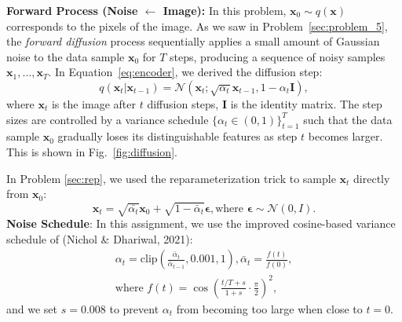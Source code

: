 \documentclass[11pt,addpoints,answers]{exam}
\newcommand{\xv}{\mathbf{x}}
\newcommand{\epsilonv   }{\boldsymbol \epsilon   }
\begin{document}
\begin{questions}
    \textbf{Forward Process (Noise $\leftarrow$ Image):} 
    In this problem, $\xv_0 \sim q(\xv)$ corresponds to the pixels of the image. As we saw in Problem~\ref{sec:problem_5}, the \textit{forward diffusion} process  sequentially applies a small amount of Gaussian noise to the data sample $\xv_0$ for \( T \) steps, producing a sequence of noisy samples \( \xv_1, \ldots, \xv_T \).
    In Equation~\ref{eq:encoder}, we derived the diffusion step:
    \begin{equation}
        q(\xv_t | \xv_{t-1}) = \mathcal{N}(\xv_t; \sqrt{\alpha_t}\xv_{t-1}, 1-\alpha_t \boldsymbol{I}),
    \end{equation}
    where $\xv_t$ is the image after $t$ diffusion steps, $\boldsymbol{I}$ is the identity matrix.
    The step sizes are controlled by a variance schedule \( \{\alpha_t \in (0,1)\}_{t=1}^T \) such that the data sample \( \xv_0 \) gradually loses its distinguishable features as step \( t \) becomes larger. This is shown in Fig.~\ref{fig:diffusion}.
    \par

    In Problem \ref{sec:rep}, we used the reparameterization trick to sample \( \xv_t \) directly from \(\xv_0 \):
    \begin{equation}
        \xv_t = \sqrt{\bar{\alpha_t}}\xv_0 + \sqrt{1 - \bar\alpha_t} \epsilonv, \text{where } \epsilonv \sim \mathcal{N}(0,I).
        \label{eq:xt}
    \end{equation}
    \textbf{Noise Schedule}: In this assignment, we use the improved cosine-based variance schedule of (Nichol \& Dhariwal, 2021):
    \begin{equation}
        \begin{aligned}
            \alpha_t = \text{clip}\left(\frac{\bar{\alpha}_t}{\bar\alpha_{t-1}}, 0.001, 1\right), \bar{\alpha}_t = \frac{f(t)}{f(0)}, \\
            \text{where } f(t) = \cos\left(\frac{t/T + s}{1 + s} \cdot \frac{\pi}{2}\right)^2,
        \end{aligned}
    \end{equation}
    and we set $s=0.008$ to prevent $\alpha_t$ from becoming too large when close to $t = 0$.
    

\end{questions}
\end{document}
